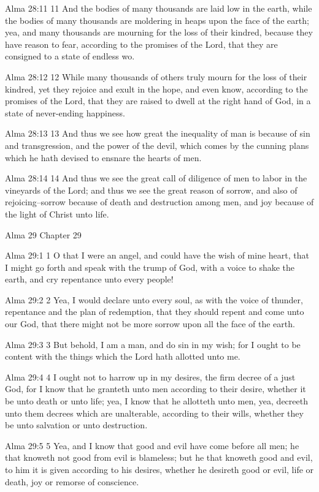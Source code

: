 Alma 28:11
 11 And the bodies of many thousands are laid low in the earth,
while the bodies of many thousands are moldering in heaps upon
the face of the earth; yea, and many thousands are mourning for
the loss of their kindred, because they have reason to fear,
according to the promises of the Lord, that they are consigned to
a state of endless wo.

Alma 28:12
 12 While many thousands of others truly mourn for the loss of
their kindred, yet they rejoice and exult in the hope, and even
know, according to the promises of the Lord, that they are raised
to dwell at the right hand of God, in a state of never-ending
happiness.

Alma 28:13
 13 And thus we see how great the inequality of man is because of
sin and transgression, and the power of the devil, which comes by
the cunning plans which he hath devised to ensnare the hearts of
men.

Alma 28:14
 14 And thus we see the great call of diligence of men to labor
in the vineyards of the Lord; and thus we see the great reason of
sorrow, and also of rejoicing--sorrow because of death and
destruction among men, and joy because of the light of Christ
unto life.

Alma 29
Chapter 29

Alma 29:1
 1 O that I were an angel, and could have the wish of mine heart,
that I might go forth and speak with the trump of God, with a
voice to shake the earth, and cry repentance unto every people!

Alma 29:2
 2 Yea, I would declare unto every soul, as with the voice of
thunder, repentance and the plan of redemption, that they should
repent and come unto our God, that there might not be more sorrow
upon all the face of the earth.

Alma 29:3
 3 But behold, I am a man, and do sin in my wish; for I ought to
be content with the things which the Lord hath allotted unto me.

Alma 29:4
 4 I ought not to harrow up in my desires, the firm decree of a
just God, for I know that he granteth unto men according to their
desire, whether it be unto death or unto life; yea, I know that
he allotteth unto men, yea, decreeth unto them decrees which are
unalterable, according to their wills, whether they be unto
salvation or unto destruction.

Alma 29:5
 5 Yea, and I know that good and evil have come before all men;
he that knoweth not good from evil is blameless; but he that
knoweth good and evil, to him it is given according to his
desires, whether he desireth good or evil, life or death, joy or
remorse of conscience.

